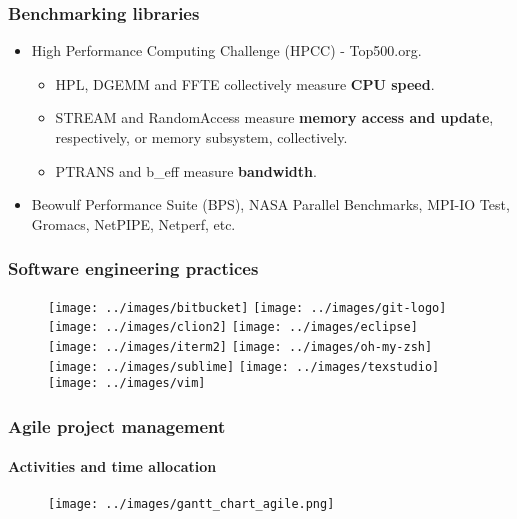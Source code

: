 \documentclass[11pt]{beamer}
\begin{document}
\begin{frame}
\frametitle{Benchmarking libraries}
\begin{itemize}
	\item High Performance Computing Challenge (HPCC) - Top500.org.
	\begin{itemize}
		\item HPL, DGEMM and FFTE collectively measure \textbf{CPU speed}.
		\item STREAM and RandomAccess measure \textbf{memory access and update}, respectively, or memory subsystem, collectively.
		\item PTRANS and b\_eff measure \textbf{bandwidth}.
	\end{itemize}
	\item Beowulf Performance Suite (BPS), NASA Parallel Benchmarks, MPI-IO Test, Gromacs, NetPIPE, Netperf, etc.
\end{itemize}

\end{frame}

\begin{frame}
\frametitle{Software engineering practices}
\begin{figure}[h]
	\centering
	\texttt{[image: ../images/bitbucket]} \hspace{1mm}
	\texttt{[image: ../images/git-logo]} \hspace{1mm}
	\texttt{[image: ../images/clion2]} \hspace{1mm}
	\texttt{[image: ../images/eclipse]} \vspace{1cm}
	\texttt{[image: ../images/iterm2]} \hspace{0mm}
	\texttt{[image: ../images/oh-my-zsh]} \hspace{2mm}
	\texttt{[image: ../images/sublime]} \hspace{2mm}
	\texttt{[image: ../images/texstudio]} \hspace{2mm}
	\texttt{[image: ../images/vim]} 
\end{figure}

\end{frame}

\begin{frame}
\frametitle{Agile project management}
\framesubtitle{Activities and time allocation}
\begin{figure}[h]
	\centering
	\texttt{[image: ../images/gantt\_chart\_agile.png]}
	\label{gantt_chart_agile}
\end{figure}
\end{frame}
\end{document}
